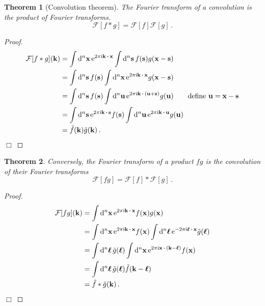 \documentclass{article}
\theoremstyle{plain}\theoremheaderfont{\normalfont\itshape}\theorembodyfont{\rmfamily}\theoremseparator{.}\newtheorem*{rem}{Remark}\newtheorem*{ex}{Example}\newtheorem*{proof}{Proof}\newtheorem*{altp}{Alternative proof}
\theoremstyle{plain}\theoremheaderfont{\normalfont\bfseries}\theorembodyfont{\rmfamily}\theoremseparator{.}\newtheorem{thm}{Theorem}[section]\newtheorem{lem}[thm]{Lemma}\newtheorem{prop}[thm]{Proposition}\newtheorem*{cor}{Corollary}\newtheorem{defn}[thm]{Definition}\newtheorem{clm}[thm]{Claim}\newtheorem{clminproof}{Claim}\newtheorem*{law}{Law}\newtheorem{pos}[thm]{Postulate}
\theoremstyle{break}\theoremheaderfont{\normalfont\itshape}\theorembodyfont{\rmfamily}\theoremseparator{.\medskip}\newtheorem*{proofskip}{Proof}\newtheorem*{exs}{Examples}\newtheorem*{rems}{Remarks}
\theoremstyle{break}\theoremheaderfont{\normalfont\bfseries}\theorembodyfont{\rmfamily}\theoremseparator{.\medskip}\newtheorem{lemskip}[thm]{Lemma}\newtheorem{defnskip}[thm]{Definition}\newtheorem{propskip}[thm]{Proposition}\newtheorem{thmskip}[thm]{Theorem}
\numberwithin{equation}{section}
\newcommand{\qed}{\hfill\ensuremath{\Box}}
\newcommand{\ii}{\mathrm{i}}
\newcommand{\ee}{\mathrm{e}}
\newcommand{\dd}[2][]{\mathrm{d}^{#1} #2\,}
\newcommand{\vb}[1]{\bm{\mathrm{#1}}}
\newcommand{\vdot}{\,\bm{\mathrm{\cdot}}\,}
\begin{document}
    \begin{thm}[Convolution theorem]
        The Fourier transform of a convolution is the product of Fourier transforms.
        \begin{equation}
            \mathcal{F}[f*g]=\mathcal{F}[f]\mathcal{F}[g]\,.
        \end{equation}
    \end{thm}
    \begin{proof}
        \begin{align}
            \mathcal{F}[f*g](\vb{k})&=\int\dd[n]{\vb{x}}\ee^{2\pi \ii\vb{k}\vdot\vb{x}}\int\dd[n]{\vb{s}}f(\vb{s})g(\vb{x}-\vb{s})\notag\\
            &=\int\dd[n]{\vb{s}}f(\vb{s})\int\dd[n]{\vb{x}}\ee^{2\pi \ii\vb{k}\vdot\vb{x}}g(\vb{x}-\vb{s})\notag\\
            &=\int\dd[n]{\vb{s}}f(\vb{s})\int\dd[n]{\vb{u}}\ee^{2\pi \ii\vb{k}\vdot(\vb{u}+\vb{s})}g(\vb{u}) \qquad\text{define }\vb{u}=\vb{x}-\vb{s}\notag \\
            &=\int\dd[n]{\vb{s}}\ee^{2\pi \ii\vb{k}\vdot\vb{s}}f(\vb{s})\int\dd[n]{\vb{u}}\ee^{2\pi \ii\vb{k}\vdot\vb{u}}g(\vb{u})\notag \\
            &=\tilde{f}(\vb{k})\tilde{g}(\vb{k})\,.
        \end{align}\qed
    \end{proof}
    \begin{thm}
        Conversely, the Fourier transform of a product \(fg\) is the convolution of their Fourier transforms
        \begin{equation}
            \mathcal{F}[fg]=\mathcal{F}[f]*\mathcal{F}[g]\,.
        \end{equation}
    \end{thm}
    \begin{proof}
        \begin{align}
            \mathcal{F}[fg](\vb{k})&=\int\dd[n]{\vb{x}}\ee^{2\pi \ii\vb{k}\vdot\vb{x}}f(\vb{x})g(\vb{x})\notag \\
            &=\int\dd[n]{\vb{x}}\ee^{2\pi \ii\vb{k}\vdot\vb{x}}f(\vb{x})\int\dd[n]{\vb{\ell}}\ee^{-2\pi \ii\vb{\ell}\vdot\vb{x}}\tilde{g}(\vb{\ell})\notag \\
            &=\int\dd[n]{\vb{\ell}}\tilde{g}(\vb{\ell})\int\dd[n]{\vb{x}}\ee^{2\pi \ii\vb{x}\vdot(\vb{k}-\vb{\ell})}f(\vb{x})\notag \\
            &=\int\dd[n]{\vb{\ell}}\tilde{g}(\vb{\ell})\tilde{f}(\vb{k}-\vb{\ell})\notag \\
            &=\tilde{f}*\tilde{g}(\vb{k})\,.
        \end{align}\qed
    \end{proof}
\end{document}
